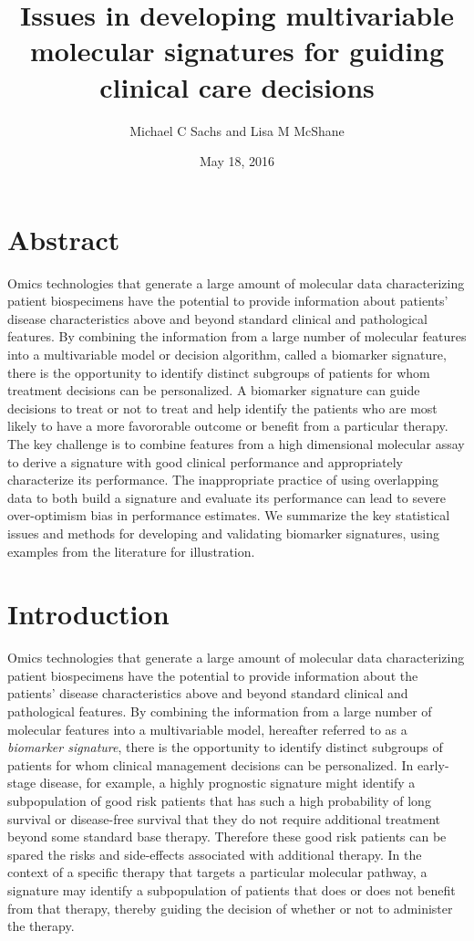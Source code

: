 \documentclass[11pt,]{article}
\title{Issues in developing multivariable molecular signatures for guiding
clinical care decisions}
\author{Michael C Sachs and Lisa M McShane}
\date{May 18, 2016}
\begin{document}
\maketitle


\section{Abstract}\label{abstract}

Omics technologies that generate a large amount of molecular data
characterizing patient biospecimens have the potential to provide
information about patients' disease characteristics above and beyond
standard clinical and pathological features. By combining the
information from a large number of molecular features into a
multivariable model or decision algorithm, called a biomarker signature,
there is the opportunity to identify distinct subgroups of patients for
whom treatment decisions can be personalized. A biomarker signature can
guide decisions to treat or not to treat and help identify the patients
who are most likely to have a more favororable outcome or benefit from a
particular therapy. The key challenge is to combine features from a high
dimensional molecular assay to derive a signature with good clinical
performance and appropriately characterize its performance. The
inappropriate practice of using overlapping data to both build a
signature and evaluate its performance can lead to severe over-optimism
bias in performance estimates. We summarize the key statistical issues
and methods for developing and validating biomarker signatures, using
examples from the literature for illustration.

\section{Introduction}\label{introduction}

Omics technologies that generate a large amount of molecular data
characterizing patient biospecimens have the potential to provide
information about the patients' disease characteristics above and beyond
standard clinical and pathological features. By combining the
information from a large number of molecular features into a
multivariable model, hereafter referred to as a \emph{biomarker
signature}, there is the opportunity to identify distinct subgroups of
patients for whom clinical management decisions can be personalized. In
early-stage disease, for example, a highly prognostic signature might
identify a subpopulation of good risk patients that has such a high
probability of long survival or disease-free survival that they do not
require additional treatment beyond some standard base therapy.
Therefore these good risk patients can be spared the risks and
side-effects associated with additional therapy. In the context of a
specific therapy that targets a particular molecular pathway, a
signature may identify a subpopulation of patients that does or does not
benefit from that therapy, thereby guiding the decision of whether or
not to administer the therapy.
\end{document}
